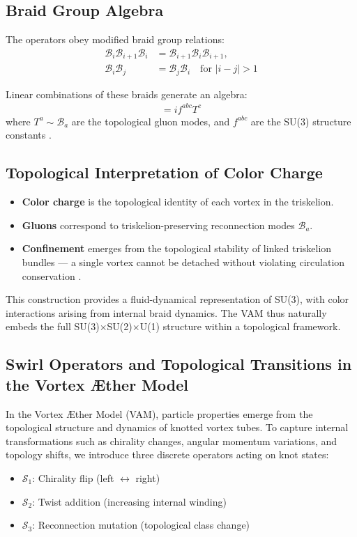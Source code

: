 \subsection*{Braid Group Algebra}

The operators obey modified braid group relations:
\begin{align}
\mathcal{B}_i \mathcal{B}_{i+1} \mathcal{B}_i &= \mathcal{B}_{i+1} \mathcal{B}_i \mathcal{B}_{i+1}, \\
\mathcal{B}_i \mathcal{B}_j &= \mathcal{B}_j \mathcal{B}_i \quad \text{for } |i-j| > 1
\end{align}

Linear combinations of these braids generate an algebra:
\begin{align}
[T^a, T^b] = i f^{abc} T^c
\end{align}
where \( T^a \sim \mathcal{B}_a \) are the topological gluon modes, and \( f^{abc} \) are the SU(3) structure constants \cite{witten1989quantum}.

\subsection*{Topological Interpretation of Color Charge}

\begin{itemize}
    \item \textbf{Color charge} is the topological identity of each vortex in the triskelion.
    \item \textbf{Gluons} correspond to triskelion-preserving reconnection modes \( \mathcal{B}_a \).
    \item \textbf{Confinement} emerges from the topological stability of linked triskelion bundles — a single vortex cannot be detached without violating circulation conservation \cite{kauffman1991knots,faddeev1997knots}.
\end{itemize}

This construction provides a fluid-dynamical representation of SU(3), with color interactions arising from internal braid dynamics. The VAM thus naturally embeds the full SU(3)$\times$SU(2)$\times$U(1) structure within a topological framework.

\subsection{Swirl Operators and Topological Transitions in the Vortex Æther Model}

In the Vortex Æther Model (VAM), particle properties emerge from the topological structure and dynamics of knotted vortex tubes. To capture internal transformations such as chirality changes, angular momentum variations, and topology shifts, we introduce three discrete operators acting on knot states:
\begin{itemize}
    \item $\mathcal{S}_1$: Chirality flip (left $\leftrightarrow$ right)
    \item $\mathcal{S}_2$: Twist addition (increasing internal winding)
    \item $\mathcal{S}_3$: Reconnection mutation (topological class change)
\end{itemize}

